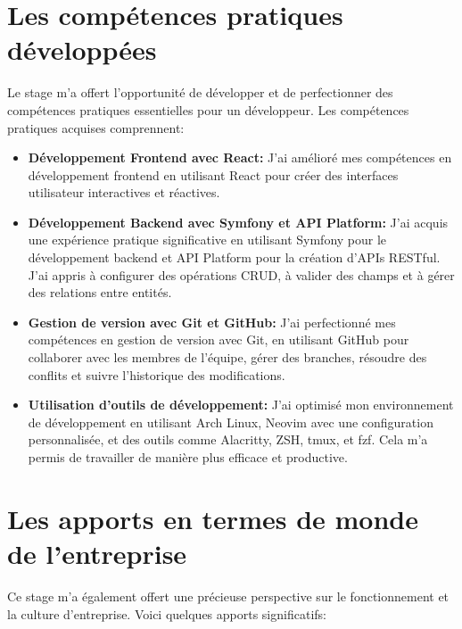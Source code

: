 \section{Les compétences pratiques développées}

\hspace{16pt}Le stage m’a offert l’opportunité de développer et de perfectionner des compétences pratiques essentielles pour un développeur. Les compétences pratiques acquises comprennent:

\begin{itemize}
  \item \textbf{Développement Frontend avec React: } J’ai amélioré mes compétences en développement frontend en utilisant React pour créer des interfaces utilisateur interactives et réactives.
  \item \textbf{Développement Backend avec Symfony et API Platform: }J’ai acquis une expérience pratique significative en utilisant Symfony pour le développement backend et API Platform pour la création d’APIs RESTful. J’ai appris à configurer des opérations CRUD, à valider des champs et à gérer des relations entre entités.
  \item \textbf{Gestion de version avec Git et GitHub: }J’ai perfectionné mes compétences en gestion de version avec Git, en utilisant GitHub pour collaborer avec les membres de l’équipe, gérer des branches, résoudre des conflits et suivre l’historique des modifications.
  \item \textbf{Utilisation d’outils de développement: }J’ai optimisé mon environnement de développement en utilisant Arch Linux, Neovim avec une configuration personnalisée, et des outils comme Alacritty, ZSH, tmux, et fzf. Cela m’a permis de travailler de manière plus efficace et productive.
\end{itemize}

\section{Les apports en termes de monde de l'entreprise}

\hspace{16pt}Ce stage m’a également offert une précieuse perspective sur le fonctionnement et la culture d’entreprise. Voici quelques apports significatifs:

